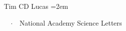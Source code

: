 \documentclass{scrartcl}
\newcommand{\MarginText}[1]{\marginpar{\raggedleft\itshape\small#1}} %
\newcommand{\Description}[1]{\hangindent=2em\hangafter=0\noindent\raggedright\footnotesize{#1}\par\normalsize\vspace{1em}} %
\begin{document}
\begin{cv}{Tim {\Large CD} Lucas}
\Description{\ \ $\cdotp$\ \ National Academy Science Letters}

\vspace{-0.5em} %








\end{cv}
\end{document}
